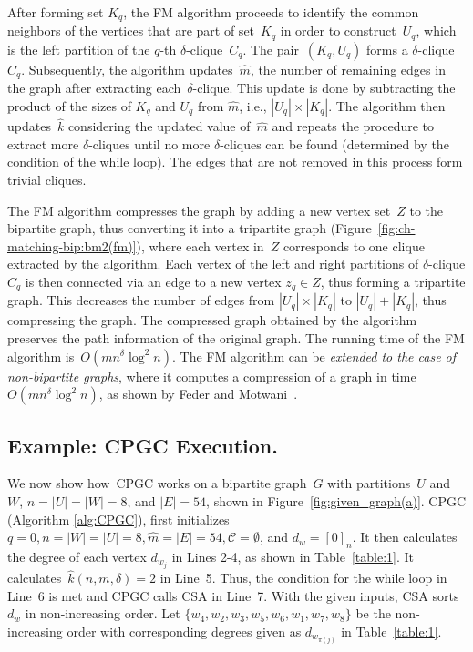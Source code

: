 After forming set $K_q$, the \textsf{FM} algorithm proceeds to identify the common neighbors of the vertices that are part of set~$K_q$ in order to construct~$U_q$, which is the left partition of the $q$-th $\delta$-clique~$C_q$. 
The pair~$(K_q, U_q)$ forms a $\delta$-clique~$C_q$. Subsequently, the algorithm updates~$\hat{m}$, the number of remaining edges in the graph after extracting each~$\delta$-clique. This update is done by subtracting the product of the sizes of $K_q$ and $U_q$ from $\hat{m}$, i.e., $|U_q| \times |K_q|$. The algorithm then updates~$\hat{k}$ considering the updated value of~$\hat{m}$ and repeats the procedure to extract more $\delta$-cliques until no more $\delta$-cliques can be found (determined by the condition of the while loop). The edges that are not removed in this process form trivial cliques.

The \textsf{FM} algorithm compresses the graph by adding a new vertex set~$Z$ to the bipartite graph, thus converting it into a tripartite graph (Figure~\ref{fig:ch-matching-bip:bm2(fm)}), where each vertex in~$Z$ corresponds to one clique extracted by the algorithm. Each vertex of the left and right partitions of $\delta$-clique $C_q$ is then connected via an edge to a new vertex $z_q \in Z$, thus forming a tripartite graph.  This decreases the number of edges from $|U_q| \times |K_q|$ to $|U_q| + |K_q|$, thus compressing the graph. The compressed graph obtained by the algorithm preserves the path information of the original graph. The running time of the \textsf{FM} algorithm is~$O(mn^{\delta} \log^2 n)$. The \textsf{FM} algorithm can be \emph{extended to the case of non-bipartite graphs}, where it computes a compression of a graph in time $O(mn^{\delta} \log^2 n)$, as shown by Feder and Motwani~\cite{federMotwani}.


\subsection{Example: \textsf{CPGC} Execution.}\label{sec:appendix:example}
We now show how~\textsf{CPGC} works on a bipartite graph~$G$ with partitions~$U$ and~$W$, $n = |U| = |W| = 8$, and $|E| = 54$, shown in Figure~\ref{fig:given_graph(a)}. 
\textsf{CPGC} (Algorithm \ref{alg:CPGC}), first initializes $q = 0, n = |W| = |U| = 8 , \hat{m} = |E| = 54, \mathcal{C} = \emptyset$, and $d_w = [0]_n $. It then calculates the degree of each vertex $d_{w_j}$ in Lines 2-4, as shown in Table~\ref{table:1}. It calculates~$\hat{k}(n,m,\delta) = 2$ in Line~5. Thus, the condition for the while loop in Line~6 is met and \textsf{CPGC} calls \textsf{CSA} in Line~7. With the given inputs, \textsf{CSA} sorts~$d_w$ in non-increasing order. Let $\{w_4, w_2, w_3, w_5, w_6, w_1, w_7, w_8\}$ be the non-increasing order with corresponding degrees given as $d_{w_{\pi(j)}}$ in Table~\ref{table:1}.  

